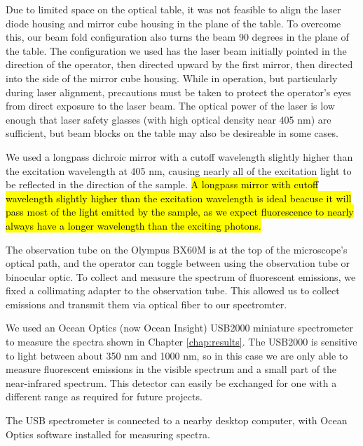 Due to limited space on the optical table, it was not feasible to align the laser diode housing and mirror cube housing in the plane of the table. To overcome this, our beam fold configuration also turns the beam 90 degrees in the plane of the table. The configuration we used has the laser beam initially pointed in the direction of the operator, then directed upward by the first mirror, then directed into the side of the mirror cube housing. While in operation, but particularly during laser alignment, precautions must be taken to protect the operator's eyes from direct exposure to the laser beam. The optical power of the laser is low enough that laser safety glasses (with high optical density near 405 nm) are sufficient, but beam blocks on the table may also be desireable in some cases.

We used a longpass dichroic mirror with a cutoff wavelength slightly higher than the excitation wavelength at 405 nm, causing nearly all of the excitation light to be reflected in the direction of the sample. \hl{A longpass mirror with cutoff wavelength slightly higher than the excitation wavelength is ideal beacuse it will pass most of the light emitted by the sample, as we expect fluorescence to nearly always have a longer wavelength than the exciting photons.}


The observation tube on the Olympus BX60M is at the top of the microscope's optical path, and the operator can toggle between using the observation tube or binocular optic. To collect and measure the spectrum of fluorescent emissions, we fixed a collimating adapter to the observation tube. This allowed us to collect emissions and transmit them via optical fiber to our spectromter.

We used an Ocean Optics (now Ocean Insight) USB2000 miniature spectrometer to measure the spectra shown in Chapter \ref{chap:results}. The USB2000 is sensitive to light between about 350 nm and 1000 nm, so in this case we are only able to measure fluorescent emissions in the visible spectrum and a small part of the near-infrared spectrum. This detector can easily be exchanged for one with a different range as required for future projects.

The USB spectrometer is connected to a nearby desktop computer, with Ocean Optics software installed for measuring spectra.


